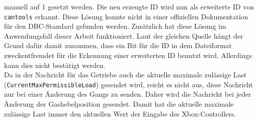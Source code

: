 manuell auf 1 gesetzt werden. Die neu erzeugte ID
wird nun als erweiterte ID von \texttt{cantools} erkannt. Diese Lösung konnte nicht in einer offiziellen Dokumentation für den
DBC-Standard gefunden werden. 
Zusätzlich hat diese Lösung im Anwendungsfall dieser Arbeit funktioniert. 
Laut der gleichen Quelle hängt der Grund dafür damit zusammen, dass ein Bit für die ID in dem Dateiformat zweckentfremdet für
die Erkennung einer erweiterten ID benutzt wird. Allerdings kann dies nicht bestätigt werden. \\
Da in der Nachricht für das Getriebe auch die aktuelle maximale zulässige Last (\texttt{CurrentMaxPermissibleLoad}) gesendet wird, 
reicht es nicht aus, diese
Nachricht nur bei einer Änderung des Gangs zu senden. Daher wird die Nachricht bei jeder Änderung der Gashebelposition
gesendet. Damit hat die aktuelle maximale zulässige Last immer den aktuellen Wert der Eingabe des Xbox-Controllers.